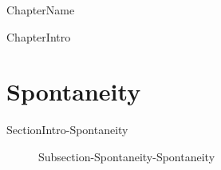 \documentclass[main.tex]{subfiles}
\newcommand\chapterlabel{Ch-thermo}\setcounter{figurenewcounter}{0}\setcounter{tablenewcounter}{0}\setcounter{formulanewcounter}{0}\chapterpicture{../{\chapterlabel}/figure1}\chapterpicturelabel{PxFuel}
\begin{document}
  
 \setcounter{chapter}{7} {ChapterName} 




  {ChapterIntro}



\section{Spontaneity}
{SectionIntro-Spontaneity}
\sloppy\begin{description}
\item[] {Subsection-Spontaneity-Spontaneity}
\end{description}
\end{document}
